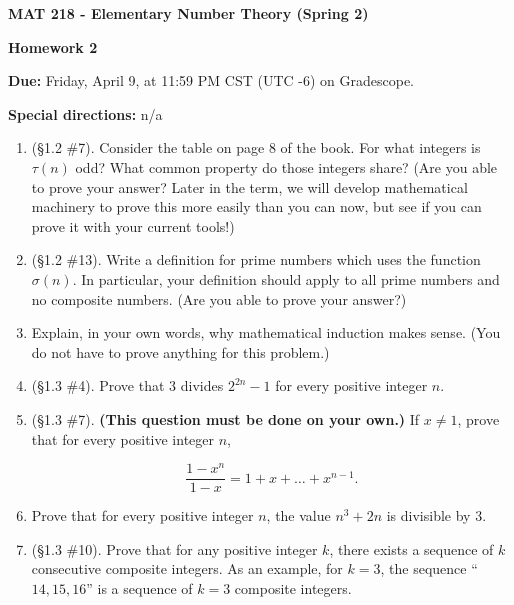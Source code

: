 \documentclass[11pt,a4paper]{article}
\begin{document}
\begin{Large}
\centerline{\bf MAT 218 - Elementary Number Theory (Spring 2)}\medskip
\centerline{\bf Homework 2}\medskip
\end{Large}
{\bf Due:} Friday, April 9, at 11:59 PM CST (UTC -6) on Gradescope.

{\bf Special directions:} n/a


\hrulefill

\begin{enumerate}
	\item (\S 1.2 \#7). Consider the table on page 8 of the book.  For what integers is \(\tau\!\left(n\right)\) odd?  What common property do those integers share? (Are you able to prove your answer? Later in the term, we will develop mathematical machinery to prove this more easily than you can now, but see if you can prove it with your current tools!)
	
	\item (\S 1.2 \#13). Write a definition for prime numbers which uses the function \(\sigma\!\left(n\right)\).  In particular, your definition should apply to all prime numbers and no composite numbers. (Are you able to prove your answer?)
	
	\item Explain, in your own words, why mathematical induction makes sense. (You do not have to prove anything for this problem.)
	
	\item (\S 1.3 \#4). Prove that \(3\) divides \(2^{2n}-1\) for every positive integer \(n\). 
	
	\item (\S 1.3 \#7). \textbf{(This question must be done on your own.)} If \(x \ne 1 \), prove that for every positive integer \(n\),
	
	\[ \frac{1-x^{n}}{1-x} = 1 + x + \ldots + x^{n-1}. \]
	
	\item Prove that for every positive integer \(n\), the value \(n^{3}+ 2n\) is divisible by \(3\).
	
	\item (\S 1.3 \#10). Prove that for any positive integer \(k\), there exists a sequence of $k$ consecutive composite integers.  As an example, for $k=3$, the sequence ``\(14, 15, 16\)'' is a sequence of \(k=3\) composite integers.
\end{enumerate}
\end{document}
